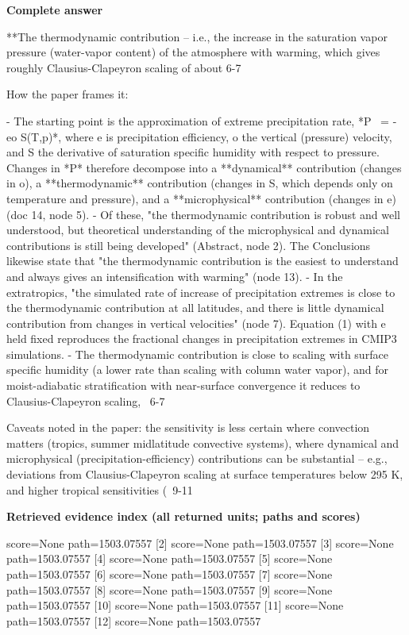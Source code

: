 \documentclass[10pt]{article}
\begin{document}
\textbf{Complete answer}
\begin{AnswerText}
**The thermodynamic contribution -- i.e., the increase in the saturation vapor pressure (water-vapor content) of the atmosphere with warming, which gives roughly Clausius-Clapeyron scaling of about 6-7 %

How the paper frames it:

- The starting point is the approximation of extreme precipitation rate, *P ~= -e{o S(T,p)}*, where e is precipitation efficiency, o the vertical (pressure) velocity, and S the derivative of saturation specific humidity with respect to pressure. Changes in *P* therefore decompose into a **dynamical** contribution (changes in o), a **thermodynamic** contribution (changes in S, which depends only on temperature and pressure), and a **microphysical** contribution (changes in e) (doc 14, node 5).
- Of these, "the thermodynamic contribution is robust and well understood, but theoretical understanding of the microphysical and dynamical contributions is still being developed" (Abstract, node 2). The Conclusions likewise state that "the thermodynamic contribution is the easiest to understand and always gives an intensification with warming" (node 13).
- In the extratropics, "the simulated rate of increase of precipitation extremes is close to the thermodynamic contribution at all latitudes, and there is little dynamical contribution from changes in vertical velocities" (node 7). Equation (1) with e held fixed reproduces the fractional changes in precipitation extremes in CMIP3 simulations.
- The thermodynamic contribution is close to scaling with surface specific humidity (a lower rate than scaling with column water vapor), and for moist-adiabatic stratification with near-surface convergence it reduces to Clausius-Clapeyron scaling, ~6-7 %

Caveats noted in the paper: the sensitivity is less certain where convection matters (tropics, summer midlatitude convective systems), where dynamical and microphysical (precipitation-efficiency) contributions can be substantial -- e.g., deviations from Clausius-Clapeyron scaling at surface temperatures below 295 K, and higher tropical sensitivities (~9-11 %
\end{AnswerText}

\textbf{Retrieved evidence index (all returned units; paths and scores) }
\begin{EvidenceText}
[1] score=None path=1503.07557
[2] score=None path=1503.07557
[3] score=None path=1503.07557
[4] score=None path=1503.07557
[5] score=None path=1503.07557
[6] score=None path=1503.07557
[7] score=None path=1503.07557
[8] score=None path=1503.07557
[9] score=None path=1503.07557
[10] score=None path=1503.07557
[11] score=None path=1503.07557
[12] score=None path=1503.07557
\end{EvidenceText}
\end{document}
